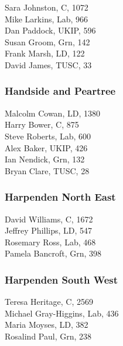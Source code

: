 \documentclass[a4paper,openany,10pt]{book}
\begin{document}


Sara Johnston, C, 1072\\
Mike Larkins, Lab, 966\\
Dan Paddock, UKIP, 596\\
Susan Groom, Grn, 142\\
Frank Marsh, LD, 122\\
David James, TUSC, 33\\


\subsubsection*{Handside and Peartree}



Malcolm Cowan, LD, 1380\\
Harry Bower, C, 875\\
Steve Roberts, Lab, 600\\
Alex Baker, UKIP, 426\\
Ian Nendick, Grn, 132\\
Bryan Clare, TUSC, 28\\


\subsubsection*{Harpenden North East}



David Williams, C, 1672\\
Jeffrey Phillips, LD, 547\\
Rosemary Ross, Lab, 468\\
Pamela Bancroft, Grn, 398\\


\subsubsection*{Harpenden South West}



Teresa Heritage, C, 2569\\
Michael Gray-Higgins, Lab, 436\\
Maria Moyses, LD, 382\\
Rosalind Paul, Grn, 238\\
\end{document}

